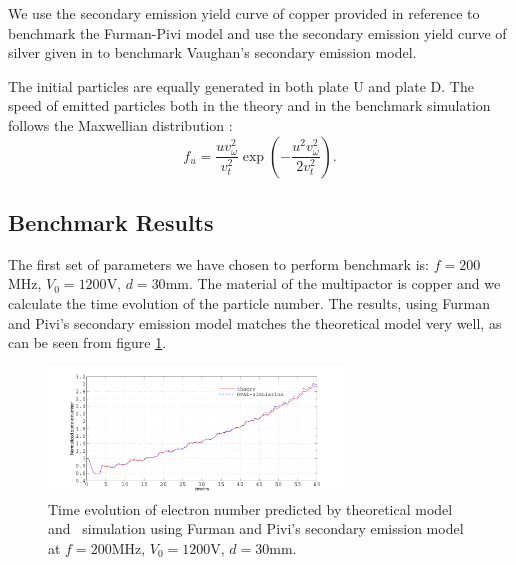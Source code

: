 \documentclass[aps,prstab,superscriptaddress,showpacs]{revtex4-1}
\begin{document}
We use the secondary emission yield curve of copper provided in reference \cite{Furman-Pivi} to benchmark the Furman-Pivi model and use the secondary emission yield curve of silver given in \cite{Non} to benchmark Vaughan's  secondary emission model.

The initial particles are equally generated in both plate U and plate D. The speed of emitted particles both in the theory and in the benchmark simulation follows the Maxwellian distribution \cite{Non}: 
\begin{equation}
f_u=\frac{uv^2_{\omega}}{v^2_t}\exp{\left(-\frac{u^2v^2_{\omega}}{2v^2_t}\right)}.\label{maxwellian}
\end{equation}
\subsection{Benchmark Results}
The first set of parameters we have chosen to perform benchmark is: $f=200$MHz, $V_0=1200$V, $d=30$mm. The material of the multipactor is copper and we calculate the time evolution of the particle number. The results, using  Furman and Pivi's secondary emission model matches the theoretical model very well, as can be seen from figure \ref{fig:results}.   
\begin{figure}[]
\begin{center}
\includegraphics[width=0.7\textwidth]{figures/match.pdf}
\end{center}
\caption{Time evolution of electron number predicted by theoretical model and \opal\ simulation using Furman and Pivi's secondary emission model at $f=200$MHz, $V_0=1200$V, $d=30$mm.\label{fig:results}}
\end{figure}
\end{document}
